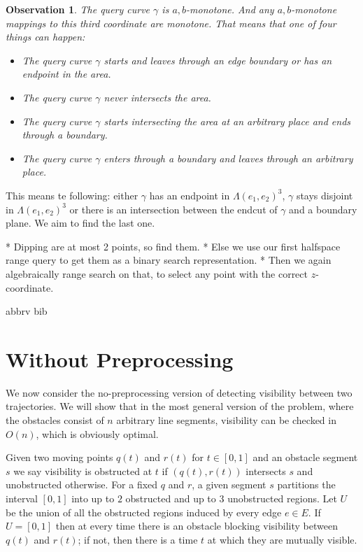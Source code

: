 \documentclass[a4paper, UKenglish]{lipics-v2018}
\newtheorem{observation}{Observation}
\begin{document}
\begin{observation}
The query curve $\gamma$ is $a,b$-monotone. And any $a,b$-monotone mappings to this third coordinate are monotone. That means that one of four things can happen:
\begin{itemize}
\item The query curve $\gamma$ starts and leaves through an edge boundary or has an endpoint in the area.
\item The query curve $\gamma$ never intersects the area.
\item The query curve $\gamma$ starts intersecting the area at an arbitrary place and ends through a boundary.
\item The query curve $\gamma$ enters through a boundary and leaves through an arbitrary place. 
\end{itemize}
\end{observation}

This means te following: either $\gamma$ has an endpoint in $\Lambda(e_1, e_2)^3$, $\gamma$ stays disjoint in $\Lambda(e_1, e_2)^3$ or there is an intersection between the endcut of $\gamma$ and a boundary plane. We aim to find the last one.

* Dipping are at most 2 points, so find them.
* Else we use our first halfspace range query to get them as a binary search representation.
* Then we again algebraically range search on that, to select any point with the correct $z$-coordinate.







\newpage 
 {abbrv}
 {bib}



\newpage
\appendix

\section{Without Preprocessing}
We now consider the no-preprocessing version of detecting visibility between two trajectories. We will show that in the most general version of the problem, where the obstacles consist of $n$ arbitrary line segments, visibility can be checked in $O(n)$, which is obviously optimal.

Given two moving points $q(t)$ and $r(t)$ for $t \in [0, 1]$ and an obstacle segment $s$ we say visibility is obstructed at $t$ if $(q(t), r(t))$ intersects $s$ and unobstructed otherwise. For a fixed $q$ and $r$, a given segment $s$ partitions the interval $[0, 1]$ into up to $2$ obstructed and up to $3$ unobstructed regions. Let $U$ be the union of all the obstructed regions induced by every edge $e \in E$. If $U = [0,1]$ then at every time there is an obstacle blocking visibility between $q(t)$ and $r(t)$; if not, then there is a time $t$ at which they are mutually visible.
\end{document}
